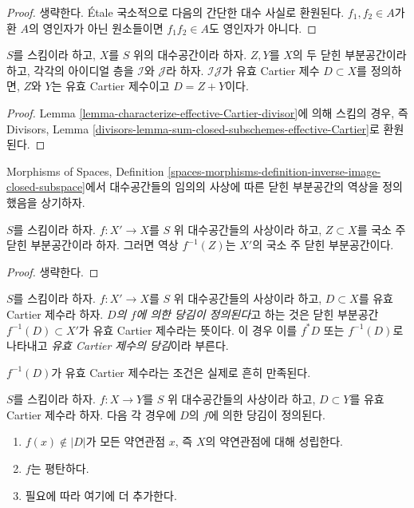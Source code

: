 \begin{proof}
생략한다. \'Etale 국소적으로 다음의 간단한 대수 사실로 환원된다.
$f_1, f_2 \in A$가 환 $A$의 영인자가 아닌 원소들이면
$f_1f_2 \in A$도 영인자가 아니다.
\end{proof}

\begin{lemma}
\label{lemma-sum-closed-subschemes-effective-Cartier}
$S$를 스킴이라 하고, $X$를 $S$ 위의 대수공간이라 하자.
$Z, Y$를 $X$의 두 닫힌 부분공간이라 하고, 각각의 아이디얼 층을
$\mathcal{I}$와 $\mathcal{J}$라 하자. $\mathcal{I}\mathcal{J}$가 유효
Cartier 제수 $D \subset X$를 정의하면, $Z$와 $Y$는 유효 Cartier 제수이고
$D = Z + Y$이다.
\end{lemma}

\begin{proof}
Lemma \ref{lemma-characterize-effective-Cartier-divisor}에 의해 스킴의 경우,
즉 Divisors, Lemma
\ref{divisors-lemma-sum-closed-subschemes-effective-Cartier}로 환원된다.
\end{proof}

\noindent
Morphisms of Spaces, Definition
\ref{spaces-morphisms-definition-inverse-image-closed-subspace}에서 대수공간들의
임의의 사상에 따른 닫힌 부분공간의 역상을 정의했음을 상기하자.

\begin{lemma}
\label{lemma-pullback-locally-principal}
$S$를 스킴이라 하자. $f : X' \to X$를 $S$ 위 대수공간들의 사상이라 하고,
$Z \subset X$를 국소 주 닫힌 부분공간이라 하자. 그러면 역상
$f^{-1}(Z)$는 $X'$의 국소 주 닫힌 부분공간이다.
\end{lemma}

\begin{proof}
생략한다.
\end{proof}





\begin{definition}
\label{definition-pullback-effective-Cartier-divisor}
$S$를 스킴이라 하자. $f : X' \to X$를 $S$ 위 대수공간들의 사상이라 하고,
$D \subset X$를 유효 Cartier 제수라 하자. {\it $D$의 $f$에 의한 당김이
정의된다}고 하는 것은 닫힌 부분공간 $f^{-1}(D) \subset X'$가 유효 Cartier
제수라는 뜻이다. 이 경우 이를 $f^*D$ 또는 $f^{-1}(D)$로 나타내고
{\it 유효 Cartier 제수의 당김}이라 부른다.
\end{definition}

\noindent
$f^{-1}(D)$가 유효 Cartier 제수라는 조건은 실제로 흔히 만족된다.

\begin{lemma}
\label{lemma-pullback-effective-Cartier-defined}
$S$를 스킴이라 하자. $f : X \to Y$를 $S$ 위 대수공간들의 사상이라 하고,
$D \subset Y$를 유효 Cartier 제수라 하자. 다음 각 경우에 $D$의
$f$에 의한 당김이 정의된다.
\begin{enumerate}
\item $f(x) \not \in |D|$가 모든 약연관점 $x$, 즉 $X$의 약연관점에 대해
성립한다.
\item $f$는 평탄하다.
\item 필요에 따라 여기에 더 추가한다.
\end{enumerate}
\end{lemma}

